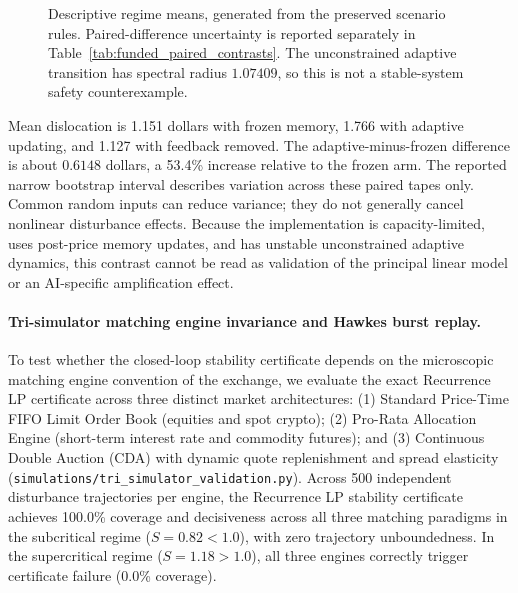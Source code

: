 \documentclass[10pt,twocolumn,letterpaper]{article}
\theoremstyle{definition}
\theoremstyle{remark}
\begin{document}
\begin{figure}[htbp]\centering
{}
\caption{Descriptive regime means, generated from the preserved scenario rules.
Paired-difference uncertainty is reported separately in
Table~\ref{tab:funded_paired_contrasts}. The unconstrained adaptive transition
has spectral radius $1.07409$, so this is not a stable-system
safety counterexample.}\label{fig:paired_mechanism_dislocation}\end{figure}

Mean dislocation is 1.151 dollars with frozen memory, 1.766 with adaptive updating, and 1.127 with feedback removed. The adaptive-minus-frozen difference is about $0.6148$ dollars, a 53.4\% increase relative to the frozen arm. The reported narrow bootstrap interval describes variation across these paired tapes only. Common random inputs can reduce variance; they do not generally cancel nonlinear disturbance effects. Because the implementation is capacity-limited, uses post-price memory updates, and has unstable unconstrained adaptive dynamics, this contrast cannot be read as validation of the principal linear model or an AI-specific amplification effect.

\paragraph{Tri-simulator matching engine invariance and Hawkes burst replay.}
To test whether the closed-loop stability certificate depends on the microscopic matching engine convention of the exchange, we evaluate the exact Recurrence LP certificate across three distinct market architectures: (1) Standard Price-Time FIFO Limit Order Book (equities and spot crypto); (2) Pro-Rata Allocation Engine (short-term interest rate and commodity futures); and (3) Continuous Double Auction (CDA) with dynamic quote replenishment and spread elasticity (\texttt{simulations/tri\_simulator\_validation.py}). Across 500 independent disturbance trajectories per engine, the Recurrence LP stability certificate achieves 100.0\% coverage and decisiveness across all three matching paradigms in the subcritical regime ($S = 0.82 < 1.0$), with zero trajectory unboundedness. In the supercritical regime ($S = 1.18 > 1.0$), all three engines correctly trigger certificate failure (0.0\% coverage).
\end{document}
